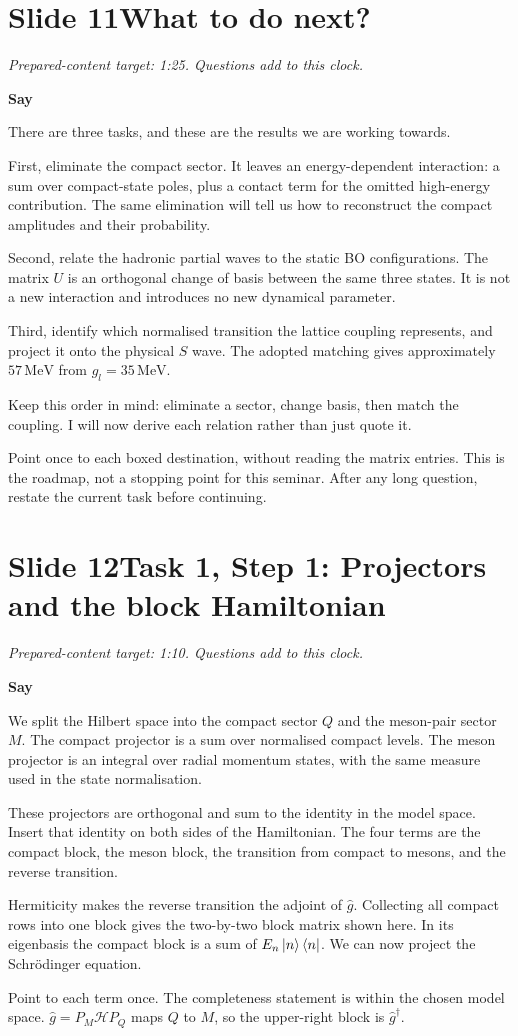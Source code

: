 \documentclass[11pt,a4paper]{article}
\newcommand{\MeV}{\,\mathrm{MeV}}
\newcommand{\cue}[1]{\begin{private}#1\end{private}}
\newenvironment{speech}{\par\textbf{Say}\par}{\par}
\newcommand{\slidenote}[3]{%
  \clearpage
  \pdfbookmark[1]{Slide #1}{slide-#1}%
  \section*{Slide #1\quad #2}
  \textit{Prepared-content target: #3. Questions add to this clock.}\par
}
\begin{document}
\slidenote{11}{What to do next?}{1:25}
\begin{speech}
There are three tasks, and these are the results we are working towards.

First, eliminate the compact sector. It leaves an energy-dependent
interaction: a sum over compact-state poles, plus a contact term for
the omitted high-energy contribution. The same elimination will tell
us how to reconstruct the compact amplitudes and their probability.

Second, relate the hadronic partial waves to the static BO configurations.
The matrix $U$ is an orthogonal change of basis between the same three
states. It is not a new interaction and introduces no new dynamical
parameter.

Third, identify which normalised transition the lattice coupling
represents, and project it onto the physical $S$ wave. The adopted
matching gives approximately $57\MeV$ from $g_l=35\MeV$.

Keep this order in mind: eliminate a sector, change basis, then match
the coupling. I will now derive each relation rather than just quote it.
\end{speech}
\cue{Point once to each boxed destination, without reading the matrix entries.
This is the roadmap, not a stopping point for this seminar. After any long
question, restate the current task before continuing.}

\slidenote{12}{Task 1, Step 1: Projectors and the block Hamiltonian}{1:10}
\begin{speech}
We split the Hilbert space into the compact sector $Q$ and the meson-pair
sector $M$. The compact projector is a sum over normalised compact
levels. The meson projector is an integral over radial momentum states,
with the same measure used in the state normalisation.

These projectors are orthogonal and sum to the identity in the model
space. Insert that identity on both sides of the Hamiltonian. The four
terms are the compact block, the meson block, the transition from
compact to mesons, and the reverse transition.

Hermiticity makes the reverse transition the adjoint of $\hat g$.
Collecting all compact rows into one block gives the two-by-two block
matrix shown here. In its eigenbasis the compact block is a sum of
$E_n\ket n\bra n$. We can now project the Schr\"odinger equation.
\end{speech}
\cue{Point to each term once. The completeness statement is within the
chosen model space. $\hat g=P_M\mathcal H P_Q$ maps $Q$ to $M$, so the
upper-right block is $\hat g^\dagger$.}
\end{document}
